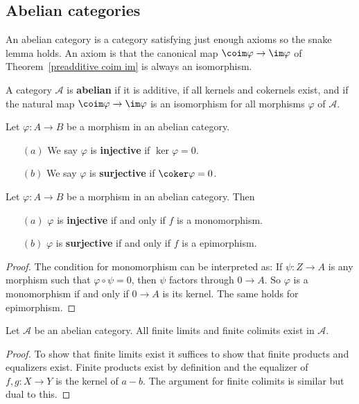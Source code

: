 \subsection{Abelian categories}
An abelian category is a category satisfying just enough axioms so the snake lemma holds. An axiom is that the canonical map $\coim\varphi\to\im\varphi$ of Theorem~\ref{preadditive coim im} is always an isomorphism.
\begin{definition}\label{ab cat def}
A category $\mathcal{A}$ is \textbf{abelian} if it is additive, if all kernels and cokernels exist, and if the natural map $\coim\varphi\to\im\varphi$ is an isomorphism for all morphisms $\varphi$ of $\mathcal{A}$.
\end{definition}
\begin{definition}
Let $\varphi:A\to B$ be a morphism in an abelian category.
\begin{itemize}
\item[$(a)$] We say $\varphi$ is \textbf{injective} if $\ker\varphi=0$.
\item[$(b)$] We say $\varphi$ is \textbf{surjective} if $\coker\varphi=0$.
\end{itemize}
\end{definition}
\begin{proposition}\label{mono epi iff ker coker}
Let $\varphi:A\to B$ be a morphism in an abelian category. Then
\begin{itemize}
\item[$(a)$] $\varphi$ is \textbf{injective} if and only if $f$ is a monomorphism.
\item[$(b)$] $\varphi$ is \textbf{surjective} if and only if $f$ is a epimorphism.
\end{itemize}
\end{proposition}
\begin{proof}
The condition for monomorphism can be interpreted as: If $\psi:Z\to A$ is any morphism such that $\varphi\circ\psi=0$, then $\psi$ factors through $0\to A$. So $\varphi$ is a monomorphism if and only if $0\to A$ is its kernel. The same holds for epimorphism.
\end{proof}
\begin{proposition}
Let $\mathcal{A}$ be an abelian category. All finite limits and finite colimits
exist in $\mathcal{A}$.
\end{proposition}
\begin{proof}
To show that finite limits exist it suffices to show that finite products and
equalizers exist. Finite products exist by definition and the equalizer of $f,g:X\to Y$ is the kernel of $a-b$. The argument for finite colimits is similar but dual to this.
\end{proof}
